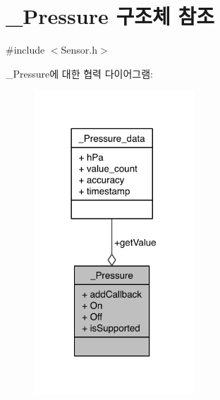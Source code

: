 \hypertarget{struct___pressure}{\section{\-\_\-\-Pressure 구조체 참조}
\label{struct___pressure}
}


{\ttfamily \#include $<$Sensor.\-h$>$}



\-\_\-\-Pressure에 대한 협력 다이어그램\-:
\nopagebreak
\begin{figure}[H]
\begin{center}
\leavevmode
\includegraphics[width=170pt]{de/da7/struct___pressure__coll__graph}
\end{center}
\end{figure}

